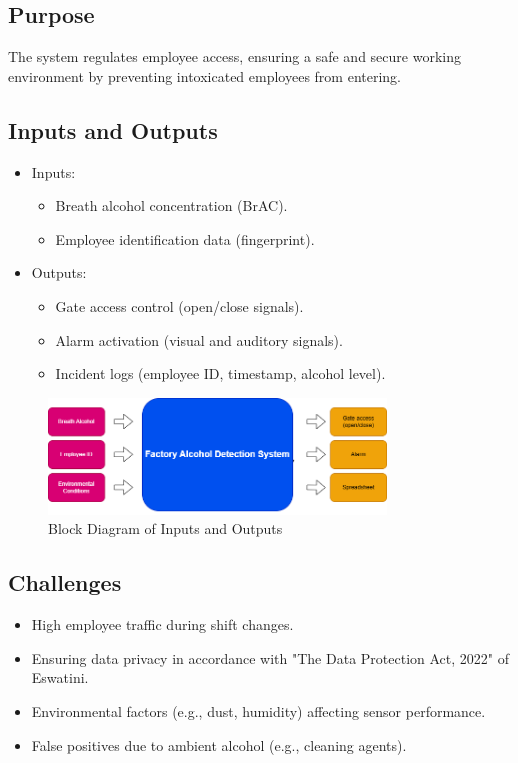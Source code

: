 \documentclass[12pt]{article}
\begin{document}
    \subsection{Purpose}
    The system regulates employee access, ensuring a safe and secure working environment by preventing intoxicated employees from entering.

    \subsection{Inputs and Outputs}
    \begin{itemize}
        \item Inputs:
        \begin{itemize}
            \item Breath alcohol concentration (BrAC).
            \item Employee identification data (fingerprint).
        \end{itemize}
        \item Outputs:
        \begin{itemize}
            \item Gate access control (open/close signals).
            \item Alarm activation (visual and auditory signals).
            \item Incident logs (employee ID, timestamp, alcohol level).
        \end{itemize}
    \end{itemize}

    \begin{figure}[H]
        \centering
        \includegraphics[width=0.8\textwidth]{images/flowChart.png}
        \caption{Block Diagram of Inputs and Outputs}
    \end{figure}

    \subsection{Challenges}
    \begin{itemize}
        \item High employee traffic during shift changes.
        \item Ensuring data privacy in accordance with "The Data Protection Act, 2022"\cite{eswatini_data_protection_act} of Eswatini. 
        \item Environmental factors (e.g., dust, humidity) affecting sensor performance.
        \item False positives due to ambient alcohol (e.g., cleaning agents).
    \end{itemize}
\end{document}
